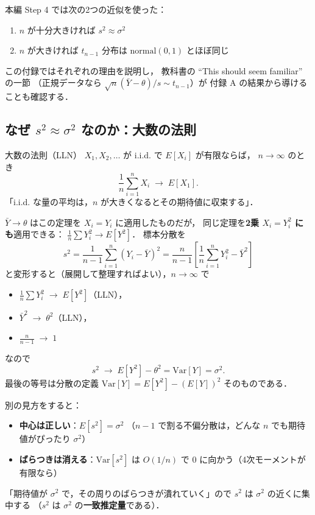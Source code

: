 \documentclass[lualatex,ja=standard,a4paper,12pt]{bxjsarticle}
\begin{document}
本編 Step 4 では次の2つの近似を使った：
\begin{enumerate}
  \item $n$ が十分大きければ $s^2 \approx \sigma^2$
  \item $n$ が大きければ $t_{n-1}$ 分布は $\mathrm{normal}(0,1)$ とほぼ同じ
\end{enumerate}
この付録ではそれぞれの理由を説明し，
教科書の ``This should seem familiar'' の一節
（正規データなら $\sqrt{n}(\bar{Y}-\theta)/s \sim t_{n-1}$）が
付録 A の結果から導けることも確認する．

\subsection{なぜ $s^2 \approx \sigma^2$ なのか：大数の法則}

\begin{thmbox}{大数の法則（LLN）}
$X_1, X_2, \ldots$ が i.i.d. で $E[X_i]$ が有限ならば，
$n \to \infty$ のとき
\[
  \frac{1}{n}\sum_{i=1}^n X_i \;\longrightarrow\; E[X_1].
\]
「i.i.d. な量の平均は，$n$ が大きくなるとその期待値に収束する」．
\end{thmbox}

$\bar{Y} \to \theta$ はこの定理を $X_i = Y_i$ に適用したものだが，
同じ定理を\textbf{2乗 $X_i = Y_i^2$ にも}適用できる：
$\frac{1}{n}\sum Y_i^2 \to E[Y^2]$．
標本分散を
\[
  s^2 = \frac{1}{n-1}\sum_{i=1}^n (Y_i - \bar{Y})^2
      = \frac{n}{n-1}\left[\frac{1}{n}\sum_{i=1}^n Y_i^2 - \bar{Y}^2\right]
\]
と変形すると（展開して整理すればよい），$n \to \infty$ で
\begin{itemize}
  \item $\frac{1}{n}\sum Y_i^2 \;\to\; E[Y^2]$（LLN），
  \item $\bar{Y}^2 \;\to\; \theta^2$（LLN），
  \item $\frac{n}{n-1} \;\to\; 1$
\end{itemize}
なので
\[
  s^2 \;\longrightarrow\; E[Y^2] - \theta^2 = \mathrm{Var}[Y] = \sigma^2.
\]
最後の等号は分散の定義
$\mathrm{Var}[Y] = E[Y^2] - (E[Y])^2$ そのものである．

\medskip
\noindent 別の見方をすると：
\begin{itemize}
  \item \textbf{中心は正しい}：$E[s^2] = \sigma^2$
        （$n-1$ で割る不偏分散は，どんな $n$ でも期待値がぴったり $\sigma^2$）
  \item \textbf{ばらつきは消える}：$\mathrm{Var}[s^2]$ は
        $O(1/n)$ で $0$ に向かう（4次モーメントが有限なら）
\end{itemize}
「期待値が $\sigma^2$ で，その周りのばらつきが潰れていく」ので
$s^2$ は $\sigma^2$ の近くに集中する
（$s^2$ は $\sigma^2$ の\textbf{一致推定量}である）．
\end{document}
